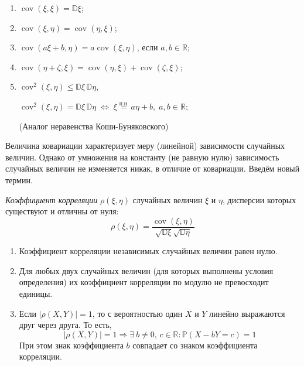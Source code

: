 \begin{namedthm}\leavevmode
    \begin{enumerate}
        \item $\operatorname{cov}(\xi, \xi)=\mathbb{D} \xi$;
        \item $\operatorname{cov}(\xi, \eta)=\operatorname{cov}(\eta, \xi)$;
        \item $\operatorname{cov}(a \xi + b, \eta)=a \operatorname{cov}(\xi, \eta)$, если $a, b \in \mathbb{R}$;
        \item $\operatorname{cov}(\eta + \zeta, \xi) = 
        \operatorname{cov}(\eta, \xi) + \operatorname{cov}(\zeta, \xi)$;
        \item $\operatorname{cov}^2(\xi, \eta) \leqslant \mathbb{D}\xi \, \mathbb{D}\eta$,
        
        $\operatorname{cov}^2(\xi, \eta) = \mathbb{D}\xi \,\mathbb{D}\eta \; \Leftrightarrow \; \xi \overset{\text{п.н.}}{=} a\eta + b, \; a, b \in \mathbb{R}$;
        
        (Аналог неравенства Коши-Буняковского)
    \end{enumerate}
\end{namedthm}

Величина ковариации характеризует меру (линейной) зависимости случайных величин. Однако от умножения на константу (не равную нулю) зависимость случайных величин не изменяется никак, в отличие от ковариации. Введём новый термин.

\begin{defn}
    {\it Коэффициент корреляции} $\rho(\xi,\eta)$ случайных величин $\xi$ и $\eta$, дисперсии которых существуют и отличны от нуля:
    \begin{equation*}
        \rho(\xi, \eta)=\frac{\operatorname{cov}(\xi, \eta)}{\sqrt{\mathbb{D} \xi} \sqrt{\mathbb{D} \eta}}
    \end{equation*}
\end{defn}

\begin{namedthm}\leavevmode
    \begin{enumerate}
        \item Коэффициент корреляции независимых случайных величин равен нулю.
        \item Для любых двух случайных величин (для которых выполнены условия определения) их коэффициент корреляции по модулю не превосходит единицы.
        \item Если $|\rho(X,Y)| = 1$, то с вероятностью один $X$ и $Y$ линейно выражаются друг через друга. То есть,
        \begin{equation*}
            |\rho(X, Y)|=1 \Longrightarrow \exists \: b \neq 0, \, c \in \mathbb{R}: \mathbb{P}(X-b Y=c)=1
        \end{equation*}
        При этом знак коэффициента $b$ совпадает со знаком коэффициента корреляции.
    \end{enumerate}
\end{namedthm}

